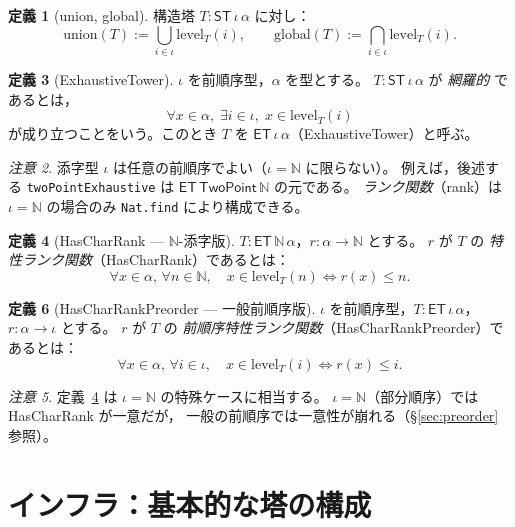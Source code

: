 \documentclass[a4paper,11pt]{ltjsarticle}
\theoremstyle{definition}
\newtheorem{definition}{定義}[section]
\theoremstyle{plain}
\theoremstyle{remark}
\newtheorem{remark}[definition]{注意}
\newcommand{\ST}{\mathsf{ST}}    %
\newcommand{\ET}{\mathsf{ET}}    %
\newcommand{\lev}{\mathrm{level}}
\newcommand{\union}{\mathrm{union}}
\newcommand{\glob}{\mathrm{global}}
\begin{document}
\begin{definition}[union, global]\label{def:union-global}
構造塔 $T : \ST\,\iota\,\alpha$ に対し：
\[
  \union(T) := \bigcup_{i \in \iota} \lev_T(i), \qquad
  \glob(T) := \bigcap_{i \in \iota} \lev_T(i).
\]
\end{definition}

\begin{definition}[ExhaustiveTower]\label{def:exhaustive}
$\iota$ を前順序型，$\alpha$ を型とする。
$T : \ST\,\iota\,\alpha$ が \emph{網羅的} であるとは，
\[
  \forall x \in \alpha,\; \exists i \in \iota,\; x \in \lev_T(i)
\]
が成り立つことをいう。このとき $T$ を
$\ET\,\iota\,\alpha$（ExhaustiveTower）と呼ぶ。

\begin{remark}
添字型 $\iota$ は任意の前順序でよい（$\iota = \mathbb{N}$ に限らない）。
例えば，後述する \texttt{twoPointExhaustive} は
$\ET\,\mathsf{TwoPoint}\,\mathbb{N}$ の元である。
\emph{ランク関数}（rank）は $\iota = \mathbb{N}$ の場合のみ
\texttt{Nat.find} により構成できる。
\end{remark}
\end{definition}

\begin{definition}[HasCharRank --- $\mathbb{N}$-添字版]\label{def:charrank}
$T : \ET\,\mathbb{N}\,\alpha$，$r : \alpha \to \mathbb{N}$ とする。
$r$ が $T$ の \emph{特性ランク関数}（HasCharRank）であるとは：
\[
  \forall x \in \alpha,\, \forall n \in \mathbb{N},\quad
  x \in \lev_T(n) \iff r(x) \leq n.
\]
\end{definition}

\begin{definition}[HasCharRankPreorder --- 一般前順序版]\label{def:charrank-preorder}
$\iota$ を前順序型，$T : \ET\,\iota\,\alpha$，$r : \alpha \to \iota$ とする。
$r$ が $T$ の \emph{前順序特性ランク関数}（HasCharRankPreorder）であるとは：
\[
  \forall x \in \alpha,\, \forall i \in \iota,\quad
  x \in \lev_T(i) \iff r(x) \leq i.
\]

\begin{remark}
定義~\ref{def:charrank} は $\iota = \mathbb{N}$ の特殊ケースに相当する。
$\iota = \mathbb{N}$（部分順序）では HasCharRank が一意だが，
一般の前順序では一意性が崩れる（§\ref{sec:preorder} 参照）。
\end{remark}
\end{definition}

\section{インフラ：基本的な塔の構成}\label{sec:basic}
\end{document}
